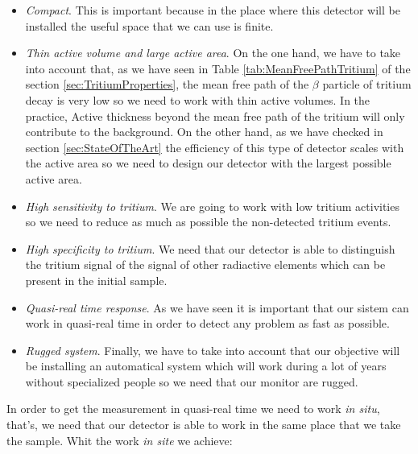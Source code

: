 \begin{itemize}

\item{} \textit{Compact}. This is important because in the place where this detector will be installed the useful space that we can use is finite.

\item{} \textit{Thin active volume and large active area}. On the one hand, we have to take into account that, as we have seen in Table \ref{tab:MeanFreePathTritium} of the section \ref{sec:TritiumProperties}, the mean free path of the $\beta$ particle of tritium decay is very low so we need to work with thin active volumes. In the practice, Active thickness beyond the mean free path of the tritium will only contribute to the background. On the other hand, as we have checked in section \ref{sec:StateOfTheArt} the efficiency of this type of detector scales with the active area so we need to design our detector with the largest possible active area.

\item{} \textit{High sensitivity to tritium}. We are going to work with low tritium activities so we need to reduce as much as possible the non-detected tritium events.

\item{} \textit{High specificity to tritium}. We need that our detector is able to distinguish the tritium signal of the signal of other radiactive elements which can be present in the initial sample.

\item{} \textit{Quasi-real time response}. As we have seen it is important that our sistem can work in quasi-real time in order to detect any problem as fast as possible. 

\item{} \textit{Rugged system}. Finally, we have to take into account that our objective will be installing an automatical system which will work during a lot of years without specialized people so we need that our monitor are rugged. 

\end{itemize}

In order to get the measurement in quasi-real time we need to work \textit{in situ}, that's, we need that our detector is able to work in the same place that we take the sample. Whit the work \textit{in site} we achieve:

